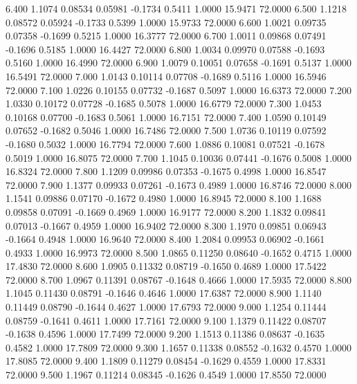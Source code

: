    6.400   1.1074   0.08534   0.05981  -0.1734   0.5411   1.0000  15.9471  72.0000
   6.500   1.1218   0.08572   0.05924  -0.1733   0.5399   1.0000  15.9733  72.0000
   6.600   1.0021   0.09735   0.07358  -0.1699   0.5215   1.0000  16.3777  72.0000
   6.700   1.0011   0.09868   0.07491  -0.1696   0.5185   1.0000  16.4427  72.0000
   6.800   1.0034   0.09970   0.07588  -0.1693   0.5160   1.0000  16.4990  72.0000
   6.900   1.0079   0.10051   0.07658  -0.1691   0.5137   1.0000  16.5491  72.0000
   7.000   1.0143   0.10114   0.07708  -0.1689   0.5116   1.0000  16.5946  72.0000
   7.100   1.0226   0.10155   0.07732  -0.1687   0.5097   1.0000  16.6373  72.0000
   7.200   1.0330   0.10172   0.07728  -0.1685   0.5078   1.0000  16.6779  72.0000
   7.300   1.0453   0.10168   0.07700  -0.1683   0.5061   1.0000  16.7151  72.0000
   7.400   1.0590   0.10149   0.07652  -0.1682   0.5046   1.0000  16.7486  72.0000
   7.500   1.0736   0.10119   0.07592  -0.1680   0.5032   1.0000  16.7794  72.0000
   7.600   1.0886   0.10081   0.07521  -0.1678   0.5019   1.0000  16.8075  72.0000
   7.700   1.1045   0.10036   0.07441  -0.1676   0.5008   1.0000  16.8324  72.0000
   7.800   1.1209   0.09986   0.07353  -0.1675   0.4998   1.0000  16.8547  72.0000
   7.900   1.1377   0.09933   0.07261  -0.1673   0.4989   1.0000  16.8746  72.0000
   8.000   1.1541   0.09886   0.07170  -0.1672   0.4980   1.0000  16.8945  72.0000
   8.100   1.1688   0.09858   0.07091  -0.1669   0.4969   1.0000  16.9177  72.0000
   8.200   1.1832   0.09841   0.07013  -0.1667   0.4959   1.0000  16.9402  72.0000
   8.300   1.1970   0.09851   0.06943  -0.1664   0.4948   1.0000  16.9640  72.0000
   8.400   1.2084   0.09953   0.06902  -0.1661   0.4933   1.0000  16.9973  72.0000
   8.500   1.0865   0.11250   0.08640  -0.1652   0.4715   1.0000  17.4830  72.0000
   8.600   1.0905   0.11332   0.08719  -0.1650   0.4689   1.0000  17.5422  72.0000
   8.700   1.0967   0.11391   0.08767  -0.1648   0.4666   1.0000  17.5935  72.0000
   8.800   1.1045   0.11430   0.08791  -0.1646   0.4646   1.0000  17.6387  72.0000
   8.900   1.1140   0.11449   0.08790  -0.1644   0.4627   1.0000  17.6793  72.0000
   9.000   1.1254   0.11444   0.08759  -0.1641   0.4611   1.0000  17.7161  72.0000
   9.100   1.1379   0.11422   0.08707  -0.1638   0.4596   1.0000  17.7499  72.0000
   9.200   1.1513   0.11386   0.08637  -0.1635   0.4582   1.0000  17.7809  72.0000
   9.300   1.1657   0.11338   0.08552  -0.1632   0.4570   1.0000  17.8085  72.0000
   9.400   1.1809   0.11279   0.08454  -0.1629   0.4559   1.0000  17.8331  72.0000
   9.500   1.1967   0.11214   0.08345  -0.1626   0.4549   1.0000  17.8550  72.0000
